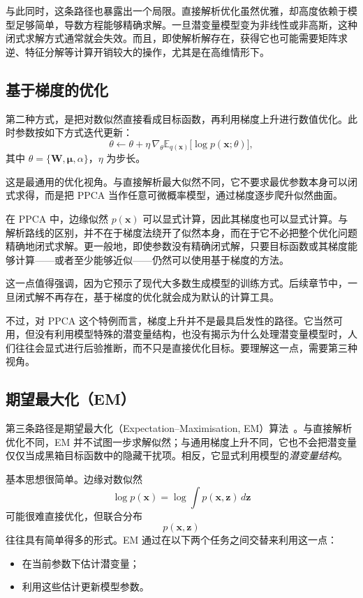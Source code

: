 与此同时，这条路径也暴露出一个局限。直接解析优化虽然优雅，却高度依赖于模型足够简单，导数方程能够精确求解。一旦潜变量模型变为非线性或非高斯，这种闭式求解方式通常就会失效。而且，即使解析解存在，获得它也可能需要矩阵求逆、特征分解等计算开销较大的操作，尤其是在高维情形下。

\subsection{基于梯度的优化}

第二种方式，是把对数似然直接看成目标函数，再利用梯度上升进行数值优化。此时参数按如下方式迭代更新：
\[
\theta
\leftarrow
\theta+\eta\,\nabla_\theta\mathbb{E}_{q(\mathbf{x})}\big[\log p(\mathbf{x};\theta)\big],
\]
其中 \(\theta=\{\mathbf{W},\boldsymbol{\mu},\alpha\}\)，\(\eta\) 为步长。

这是最通用的优化视角。与直接解析最大似然不同，它不要求最优参数本身可以闭式求得，而是把 PPCA 当作任意可微概率模型，通过梯度逐步爬升似然曲面。

在 PPCA 中，边缘似然 \(p(\mathbf{x})\) 可以显式计算，因此其梯度也可以显式计算。与解析路线的区别，并不在于梯度法绕开了似然本身，而在于它不必把整个优化问题精确地闭式求解。更一般地，即使参数没有精确闭式解，只要目标函数或其梯度能够计算——或者至少能够近似——仍然可以使用基于梯度的方法。

这一点值得强调，因为它预示了现代大多数生成模型的训练方式。后续章节中，一旦闭式解不再存在，基于梯度的优化就会成为默认的计算工具。

不过，对 PPCA 这个特例而言，梯度上升并不是最具启发性的路径。它当然可用，但没有利用模型特殊的潜变量结构，也没有揭示为什么处理潜变量模型时，人们往往会显式进行后验推断，而不只是直接优化目标。要理解这一点，需要第三种视角。

\subsection{期望最大化（EM）}

第三条路径是期望最大化（Expectation--Maximisation, EM）算法~\cite{dempster1977em}。与直接解析优化不同，EM 并不试图一步求解似然；与通用梯度上升不同，它也不会把潜变量仅仅当成黑箱目标函数中的隐藏干扰项。相反，它显式利用模型的\emph{潜变量结构}。

基本思想很简单。边缘对数似然
\[
\log p(\mathbf{x})
=
\log\int p(\mathbf{x},\mathbf{z})\,d\mathbf{z}
\]
可能很难直接优化，但联合分布
\[
p(\mathbf{x},\mathbf{z})
\]
往往具有简单得多的形式。EM 通过在以下两个任务之间交替来利用这一点：
\begin{itemize}
    \item 在当前参数下估计潜变量；
    \item 利用这些估计更新模型参数。
\end{itemize}

